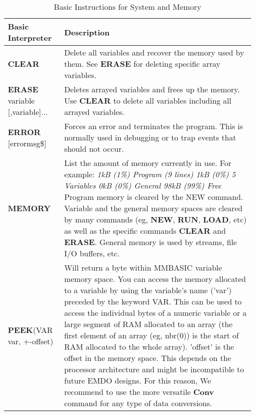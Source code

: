 \begin{table}[]
\centering
\caption{Basic Instructions for System and Memory}
\label{Basic_Instructions_for_System_and_Memory}
\begin{tabular}{|p{4cm}|p{10cm}|}
\hline
\textbf{Basic Interpreter} & \textbf{Description}                                                   \\ \hline
\textbf{CLEAR} & Delete all variables and recover the memory used by them. See \textbf{ERASE} for deleting specific array variables.
\\ \hline
\textbf{ERASE} variable
[,variable]...
&
Deletes arrayed variables and frees up the memory. \newline
Use \textbf{CLEAR} to delete all variables including all arrayed variables.
\\ \hline 
\textbf{ERROR} [errormsg\$] & Forces an error and terminates the program. This is normally used in
debugging or to trap events that should not occur.
\\ \hline
\textbf{MEMORY} & List the amount of memory currently in use. For example: \newline
 \textit{\newline 1kB (1\%) Program (9 lines) \newline 1kB (0\%) 5 Variables \newline 0kB (0\%) General \newline 98kB (99\%) Free} \newline \newline
Program memory is cleared by the NEW command. Variable and the general memory spaces are cleared by many commands (eg, \textbf{NEW}, \textbf{RUN}, \textbf{LOAD}, etc) as well as the specific commands \textbf{CLEAR} and \textbf{ERASE}. General memory is used by streams, file I/O buffers, etc.   
\\ \hline
\textbf{PEEK}(VAR var, +-offset)
& Will return a byte within MMBASIC variable memory space.\newline
You can access the memory allocated to a variable by using the
variable's name ('var') preceded by the keyword VAR. This can be used
to access the individual bytes of a numeric variable or a large segment of
RAM allocated to an array (the first element of an array (eg, nbr(0)) is
the start of RAM allocated to the whole array). 'offset' is the offset in the memory space. This depends on the processor architecture and might be incompatible to future EMDO designs. For this reason, We recommend to use the more versatile \textbf{Conv} command for any type of data conversions.
\\ \hline
\end{tabular}
\end{table}

